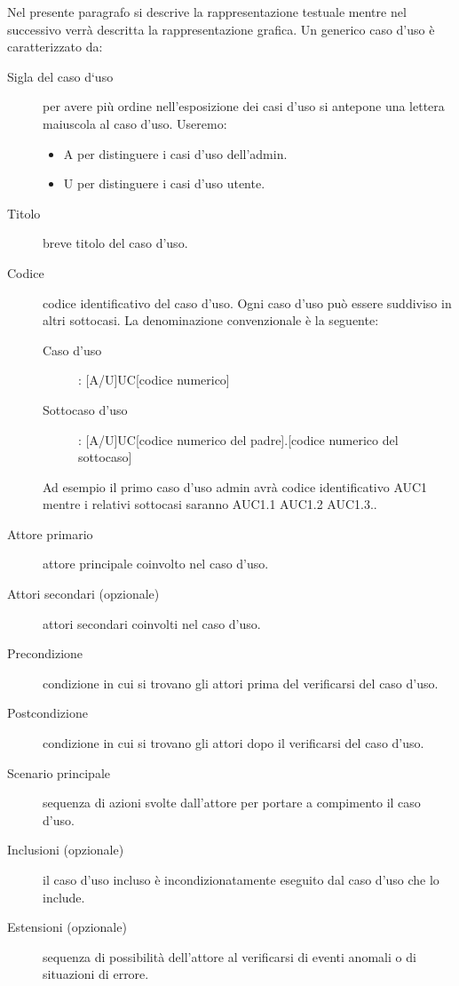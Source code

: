 \documentclass[../norme-di-progetto.tex]{subfiles}
\begin{document}
Nel presente paragrafo si descrive la rappresentazione testuale mentre nel successivo verrà descritta la rappresentazione grafica. Un generico caso d'uso è caratterizzato da:
\begin{description}
  \item [Sigla del caso d`uso] per avere più ordine nell'esposizione dei casi d'uso si antepone una lettera maiuscola al caso d'uso. Useremo:
        \begin{itemize}
          \item A per distinguere i casi d'uso dell'admin.
          \item U per distinguere i casi d'uso utente.
        \end{itemize}
  \item [Titolo] breve titolo del caso d'uso.
  \item [Codice] codice identificativo del caso d'uso. Ogni caso d'uso può essere suddiviso in altri sottocasi. La denominazione convenzionale è la seguente:
        \begin{description}
          \item [Caso d'uso]: [A/U]UC[codice numerico]
          \item [Sottocaso d'uso]: [A/U]UC[codice numerico del padre].[codice numerico del sottocaso]
        \end{description}
        Ad esempio il primo caso d'uso admin avrà codice identificativo AUC1 mentre i relativi sottocasi saranno AUC1.1 AUC1.2 AUC1.3..
  \item [Attore primario] attore principale coinvolto nel caso d'uso.
  \item [Attori secondari (opzionale)] attori secondari coinvolti nel caso d'uso.
  \item [Precondizione] condizione in cui si trovano gli attori prima del verificarsi del caso d'uso.
  \item [Postcondizione] condizione in cui si trovano gli attori dopo il verificarsi del caso d'uso.
  \item [Scenario principale] sequenza di azioni svolte dall'attore per portare a compimento il caso d'uso.
  \item [Inclusioni (opzionale)] il caso d'uso incluso è incondizionatamente eseguito dal caso d'uso che lo include.
  \item [Estensioni (opzionale)] sequenza di possibilità dell'attore al verificarsi di eventi anomali o di situazioni di errore.
\end{description}
\end{document}
